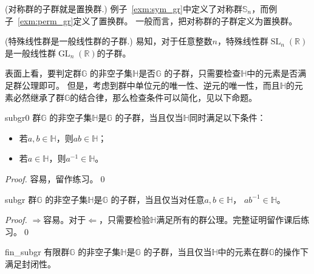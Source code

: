 \begin{example}{(对称群的子群就是置换群.)} 
\label{exm:symm_gr}
   例子~\ref{exm:sym_gr}中定义了对称群$\mathbb{S}_n$，而例子~\ref{exm:perm_gr}定义了置换群。
   一般而言，把对称群的子群定义为置换群。
\end{example}

\begin{example}{(特殊线性群是一般线性群的子群.)} 
\label{exm:gl_subgr}
易知，对于任意整数$n$，特殊线性群$\operatorname{SL}_n(\mathbb{R})$是一般线性群$\operatorname{GL}_n(\mathbb{R})$的子群。
\end{example}

表面上看，要判定群$\mathbb{G}$ 的非空子集$\mathbb{H}$是否$\mathbb{G}$ 的子群，只需要检查$\mathbb{H}$中的元素是否满足群公理即可。
但是，考虑到群中单位元的唯一性、逆元的唯一性，而且$\mathbb{H}$的元素必然继承了群$\mathbb{G}$的结合律，那么检查条件可以简化，见以下命题。
\begin{proposition}{}{subgr0}
	群$\mathbb{G}$ 的非空子集$\mathbb{H}$是$\mathbb{G}$ 的子群，当且仅当$\mathbb{H}$同时满足以下条件：
	\begin{itemize}
	\item 若$a, b \in \mathbb{H}$，则$a b \in \mathbb{H}$；
	
	\item 若$a \in \mathbb{H}$，则$a^{-1} \in \mathbb{H}$。
	\end{itemize}
\end{proposition}
	
\begin{proof}
	容易，留作练习。\qed
\end{proof}

\begin{proposition}{}{subgr}
	群$\mathbb{G}$ 的非空子集$\mathbb{H}$是$\mathbb{G}$ 的子群，当且仅当对任意$a, b \in \mathbb{H}$，
	$ab^{-1} \in \mathbb{H}$。
\end{proposition}

\begin{proof}
	$\Rightarrow$容易。对于$\Leftarrow$，只需要检验$\mathbb{H}$满足所有的群公理。完整证明留作课后练习。\qed
\end{proof}

\begin{proposition}{}{fin_subgr}
	有限群$\mathbb{G}$ 的非空子集$\mathbb{H}$是$\mathbb{G}$ 的子群，当且仅当$\mathbb{H}$中的元素在群$\mathbb{G}$的操作下
	满足封闭性。
\end{proposition}

